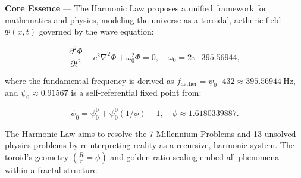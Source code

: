 
\textbf{Core Essence} --- The Harmonic Law proposes a unified framework for mathematics and physics, modeling the universe as a toroidal, aetheric field $\Phi(x, t)$ governed by the wave equation:

$$
\frac{\partial^2 \Phi}{\partial t^2} - c^2 \nabla^2 \Phi + \omega_0^2 \Phi = 0, \quad \omega_0 = 2 \pi \cdot 395.56944,
$$

where the fundamental frequency is derived as $f_{\text{aether}} = \psi_0 \cdot 432 \approx 395.56944 \mathrm{~Hz}$, and $\psi_0 \approx 0.91567$ is a self-referential fixed point from:

$$
\psi_0 = \psi_0^0 + \psi_0^0 (1 / \phi) - 1, \quad \phi \approx 1.6180339887.
$$

The Harmonic Law aims to resolve the 7 Millennium Problems and 13 unsolved physics problems by reinterpreting reality as a recursive, harmonic system. The toroid's geometry $\left(\frac{R}{r} = \phi\right)$ and golden ratio scaling embed all phenomena within a fractal structure.

